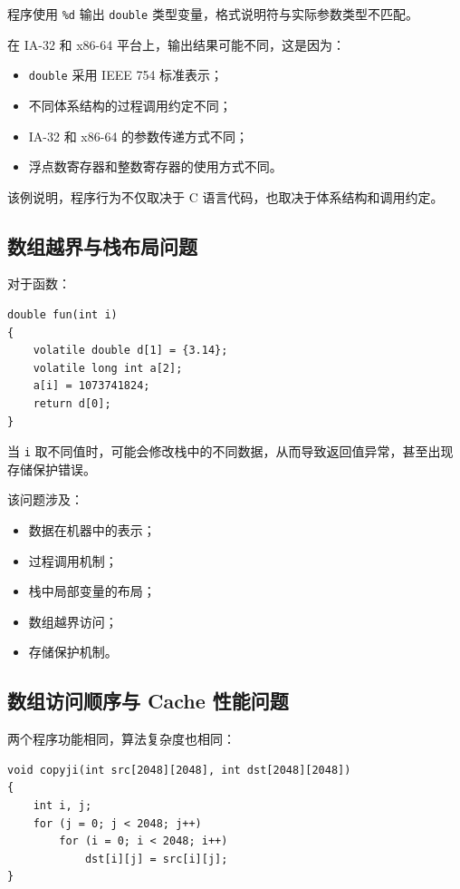 \documentclass[12pt,a4paper]{ctexart}
\begin{document}
程序使用 \texttt{\%d} 输出 \texttt{double} 类型变量，格式说明符与实际参数类型不匹配。

在 IA-32 和 x86-64 平台上，输出结果可能不同，这是因为：

\begin{itemize}
    \item \texttt{double} 采用 IEEE 754 标准表示；
    \item 不同体系结构的过程调用约定不同；
    \item IA-32 和 x86-64 的参数传递方式不同；
    \item 浮点数寄存器和整数寄存器的使用方式不同。
\end{itemize}

该例说明，程序行为不仅取决于 C 语言代码，也取决于体系结构和调用约定。

\subsection{数组越界与栈布局问题}

对于函数：

\begin{verbatim}
double fun(int i)
{
    volatile double d[1] = {3.14};
    volatile long int a[2];
    a[i] = 1073741824;
    return d[0];
}
\end{verbatim}

当 \texttt{i} 取不同值时，可能会修改栈中的不同数据，从而导致返回值异常，甚至出现存储保护错误。

该问题涉及：

\begin{itemize}
    \item 数据在机器中的表示；
    \item 过程调用机制；
    \item 栈中局部变量的布局；
    \item 数组越界访问；
    \item 存储保护机制。
\end{itemize}

\subsection{数组访问顺序与 Cache 性能问题}

两个程序功能相同，算法复杂度也相同：

\begin{verbatim}
void copyji(int src[2048][2048], int dst[2048][2048])
{
    int i, j;
    for (j = 0; j < 2048; j++)
        for (i = 0; i < 2048; i++)
            dst[i][j] = src[i][j];
}
\end{verbatim}
\end{document}
